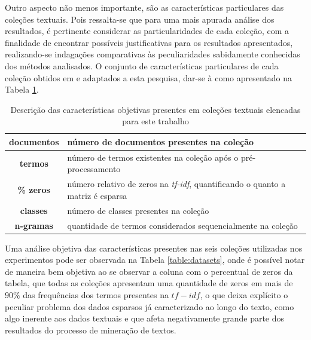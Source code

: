 Outro aspecto não menos importante, são as características particulares das coleções textuais. Pois
ressalta-se que para uma mais apurada análise dos resultados, é pertinente considerar as
particularidades de cada coleção, com a finalidade de encontrar possíveis justificativas para os
resultados apresentados, realizando-se indagações comparativas às peculiaridades sabidamente
conhecidas dos métodos analisados. O conjunto de características particulares de cada coleção 
obtidos em  e adaptados a esta pesquisa, dar-se à como apresentado
na Tabela \ref{table:datainfo}. 

\begin{table}[!htp]
  \centering
  \begin{tabular}{ |c|p{11cm}|}
    \hline
    {\bf documentos} & número de documentos presentes na coleção \\
    \hline
    {\bf termos} & número de termos existentes na coleção após o pré-processamento \\
    \hline
    {\bf \% zeros} & número relativo de zeros na {\it tf-idf\/}, quantificando o quanto a
matriz é esparsa \\
    \hline
    {\bf classes} & número de classes presentes na coleção \\
    \hline
    {\bf n-gramas} & quantidade de termos considerados sequencialmente na coleção \\
    \hline
  \end{tabular}
  \caption{Descrição das características objetivas presentes em coleções textuais elencadas para
este trabalho}
  \label{table:datainfo}
\end{table}

Uma análise objetiva das características presentes nas seis coleções utilizadas nos experimentos
pode ser observada na Tabela \ref{table:datasets}, onde é possível notar de maneira bem objetiva ao
se observar a coluna com o percentual de zeros da tabela, que todas as coleções apresentam uma
quantidade de zeros em mais de $90\%$ das frequências dos termos presentes na $tf-idf$, o que deixa
explícito o peculiar problema dos dados esparsos já caracterizado ao longo do texto, como algo
inerente aos dados textuais e que afeta negativamente grande parte dos resultados do processo de
mineração de textos.


